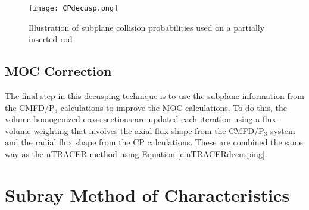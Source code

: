 \begin{figure}
    \centering
    \texttt{[image: CPdecusp.png]}
    \caption[Subplane Collision Probabilities Illustration]{Illustration of subplane collision probabilities used on a partially inserted rod}\label{f:SCPdecusping}
\end{figure}

\subsection{MOC Correction}

The final step in this decusping technique is to use the subplane information from the CMFD/P$_3$ calculations to improve the MOC calculations.  To do this, the volume-homogenized cross sections are updated each iteration using a flux-volume weighting that involves the axial flux shape from the CMFD/P$_3$ system and the radial flux shape from the CP calculations.  These are combined the same way as the nTRACER method using Equation \ref{e:nTRACERdecusping}.

\section{Subray Method of Characteristics}

